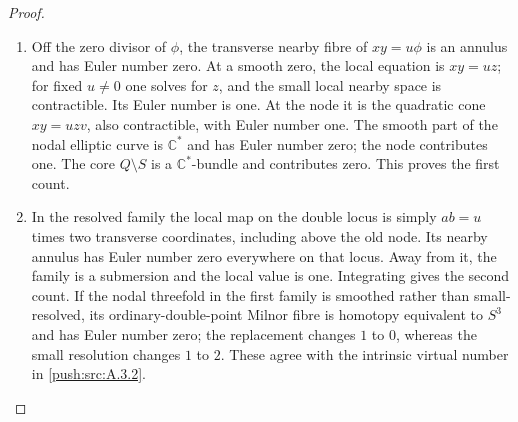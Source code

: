 \begin{proof}
\begin{enumerate}[label=\arabic*.,leftmargin=*]
\item Off the zero divisor of $\phi$, the transverse nearby
fibre of $xy=u\phi$ is an annulus and has Euler number
zero. At a smooth zero, the local equation is $xy=uz$;
for fixed $u\ne0$ one solves for $z$, and the small
local nearby space is contractible. Its Euler number
is one. At the node it is the quadratic cone
$xy=uzv$, also contractible, with Euler number one.
The smooth part of the nodal elliptic curve is
$\mathbb C^*$ and has Euler number zero; the node
contributes one. The core $Q\setminus S$ is a
$\mathbb C^*$-bundle and contributes zero.
This proves the first count.

\item In the resolved family the local map on the double locus
is simply $ab=u$ times two transverse coordinates,
including above the old node. Its nearby annulus has
Euler number zero everywhere on that locus. Away from
it, the family is a submersion and the local value is
one. Integrating gives the second count. If the nodal
threefold in the first family is smoothed rather than
small-resolved, its ordinary-double-point Milnor fibre
is homotopy equivalent to $S^3$ and has Euler number
zero; the replacement changes $1$ to $0$, whereas
the small resolution changes $1$ to $2$. These agree
with the intrinsic virtual number in \ref{push:src:A.3.2}.
\end{enumerate}
\end{proof}

